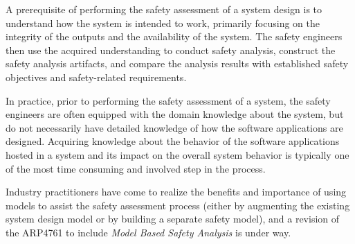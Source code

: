 A prerequisite of performing the safety assessment of a system design is to understand how the system is intended to work, primarily focusing on the integrity of the outputs and the availability of the system. The safety engineers then use the acquired understanding to conduct safety analysis, construct the safety analysis artifacts, and compare the analysis results with established safety objectives and safety-related requirements. 

In practice, prior to performing the safety assessment of a system, the safety engineers are often equipped with the domain knowledge about the system, but do not necessarily have detailed knowledge of how the software applications are designed. Acquiring knowledge about the behavior of the software applications hosted in a system and its impact on the overall system behavior is typically one of the most time consuming and involved step in the process. 

Industry practitioners have come to realize the benefits and importance of
using models to assist the safety assessment process (either by augmenting the existing system design model or by building a separate safety model), and a revision of the ARP4761 to include {\em Model Based Safety Analysis} is under way.

